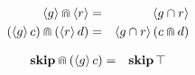 \documentclass[fleqn]{fac}
\newcommand{\labelproperty}[1]{\label{property-#1}\index{Property!#1|PropertyDef{\ref{property-#1}}}}
\newcommand{\SSeq}{\,}
\newcommand{\atomicrel}[1]{\langle#1\rangle}
\newcommand{\relint}{\cap}
\newcommand{\together}{\mathbin{\doublecap}}
\newcommand{\Keyword}[1]{\mathsf{\mathbf{#1}}}
\newcommand{\Magic}{\Keyword{\top}}
\newcommand{\Skip}{\Keyword{skip}}
\begin{document}
\noindent
\begin{minipage}[t]{0.5\textwidth}
\begin{eqnarray}
  \atomicrel{g} \together \atomicrel{r} & = & \atomicrel{g \relint r}
    \labelproperty{atomic-conjoin-atomic} \\
  (\atomicrel{g} \SSeq c) \together (\atomicrel{r} \SSeq d) & = & \atomicrel{g \relint r} \SSeq (c \together d)
    \labelproperty{non-skip-conjoin-non-skip}
\end{eqnarray}\end{minipage}
\begin{minipage}[t]{0.49\textwidth}
\begin{eqnarray}
  \Skip \together (\atomicrel{g} \SSeq c) & = & \Skip \SSeq \Magic 
    \labelproperty{skip-conjoin-non-skip} 
\end{eqnarray}\end{minipage}
\vspace{1ex}
\end{document}
